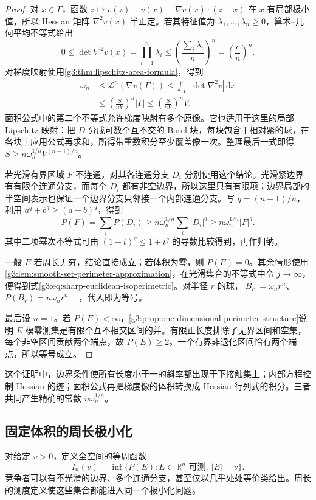 \begin{proof}
	对 \(x\in\Gamma\)，函数 \(z\mapsto v(z)-v(x)-\nabla v(x)\cdot(z-x)\) 在 \(x\) 有局部极小值，所以 Hessian 矩阵 \(\nabla^2v(x)\) 半正定。若其特征值为 \(\lambda_1,\ldots,\lambda_n\ge0\)，算术--几何平均不等式给出
	\[
		0\le\det\nabla^2v(x)=\prod_{i=1}^n\lambda_i
		\le\left(\frac{\sum_i\lambda_i}{n}\right)^n
		=\left(\frac cn\right)^n.
	\]
	对梯度映射使用\cref{g3:thm:lipschitz-area-formula}，得到
	\[
	\begin{aligned}
		\omega_n
		&\le\mathcal L^n(\nabla v(\Gamma))
		\le\int_\Gamma|\det\nabla^2v|\,\mathrm dx\\
		&\le\left(\frac{S}{nV}\right)^n|\Gamma|
		\le\left(\frac{S}{nV}\right)^nV.
	\end{aligned}
	\]
	面积公式中的第二个不等式允许梯度映射有多个原像。它也适用于这里的局部 Lipschitz 映射：把 \(D\) 分成可数个互不交的 Borel 块，每块包含于相对紧的球，在各块上应用公式再求和，所得带重数积分至少覆盖像一次。整理最后一式即得
	\(S\ge n\omega_n^{1/n}V^{(n-1)/n}\)。

	若光滑有界区域 \(F\) 不连通，对其各连通分支 \(D_i\) 分别使用这个结论。光滑紧边界有有限个连通分支，而每个 \(D_i\) 都有非空边界，所以这里只有有限项；边界局部的半空间表示也保证一个边界分支只邻接一个内部连通分支。写 \(q=(n-1)/n\)，利用 \(a^q+b^q\ge(a+b)^q\)，得到
	\[
		P(F)=\sum_iP(D_i)
		\ge n\omega_n^{1/n}\sum_i|D_i|^q
		\ge n\omega_n^{1/n}|F|^q.
	\]
	其中二项幂次不等式可由 \((1+t)^q\le1+t^q\) 的导数比较得到，再作归纳。

	一般 \(E\) 若周长无穷，结论直接成立；若体积为零，则 \(P(E)=0\)。其余情形使用\cref{g3:lem:smooth-set-perimeter-approximation}，在光滑集合的不等式中令 \(j\to\infty\)，便得到式\eqref{g3:eq:sharp-euclidean-isoperimetric}。对半径 \(r\) 的球，\(|B_r|=\omega_nr^n\)、\(P(B_r)=n\omega_nr^{n-1}\)，代入即为等号。

	最后设 \(n=1\)。若 \(P(E)<\infty\)，\cref{g3:prop:one-dimensional-perimeter-structure}说明 \(E\) 模零测集是有限个互不相交区间的并。有限正长度排除了无界区间和空集，每个非空区间贡献两个端点，故 \(P(E)\ge2\)。一个有界非退化区间恰有两个端点，所以等号成立。
\end{proof}

这个证明中，边界条件使所有长度小于一的斜率都出现于下接触集上；内部方程控制 Hessian 的迹；面积公式再把梯度像的体积转换成 Hessian 行列式的积分。三者共同产生精确的常数 \(n\omega_n^{1/n}\)。

\subsection{固定体积的周长极小化}
\label{g3:subsec:2105:04}
对给定 \(v>0\)，定义全空间的等周函数
\[
	I_n(v)=\inf\{P(E):E\subset\mathbb R^n\text{ 可测},\ |E|=v\}.
\]
竞争者可以有不光滑的边界、多个连通分支，甚至仅以几乎处处等价类给出。周长的测度定义使这些集合都能进入同一个极小化问题。

